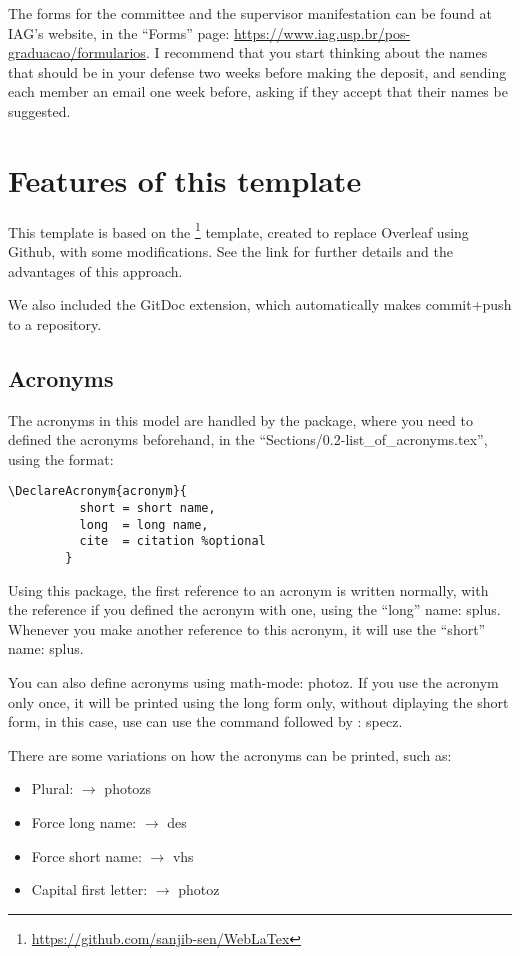   The forms for the committee and the supervisor manifestation can be found at IAG's website, in the ``Forms'' page: \url{https://www.iag.usp.br/pos-graduacao/formularios}. I recommend that you start thinking about the names that should be in your defense two weeks before making the deposit, and sending each member an email one week before, asking if they accept that their names be suggested.

  \section{Features of this template}

    This template is based on the \footnote{\url{https://github.com/sanjib-sen/WebLaTex}} template, created to replace Overleaf using Github, with some modifications. See the link for further details and the advantages of this approach.

    We also included the GitDoc extension, which automatically makes commit+push to a repository.
  
    \subsection{Acronyms}
      The acronyms in this model are handled by the  package, where you need to defined the acronyms beforehand, in the ``Sections/0.2-list\_of\_acronyms.tex'', using the format:

      \begin{lstlisting}[autogobble]
        \DeclareAcronym{acronym}{
          short = short name,
          long  = long name,
          cite  = citation %optional
        }
    \end{lstlisting}

    Using this package, the first reference to an acronym is written normally, with the reference if you defined the acronym with one, using the ``long'' name: \ac{splus}. Whenever you make another reference to this acronym, it will use the ``short'' name: \ac{splus}.
    
    You can also define acronyms using math-mode: \ac{photoz}. If you use the acronym only once, it will be printed using the long form only, without diplaying the short form, in this case, use can use the  command followed by  : \ac{specz}.

    There are some variations on how the acronyms can be printed, such as:
    \begin{itemize}
      \item Plural:  $\rightarrow$ \acp{photoz}
      \item Force long name:  $\rightarrow$ \acl{des}
      \item Force short name:  $\rightarrow$ \acs{vhs}
      \item Capital first letter:  $\rightarrow$ \Ac{photoz}
    \end{itemize}

